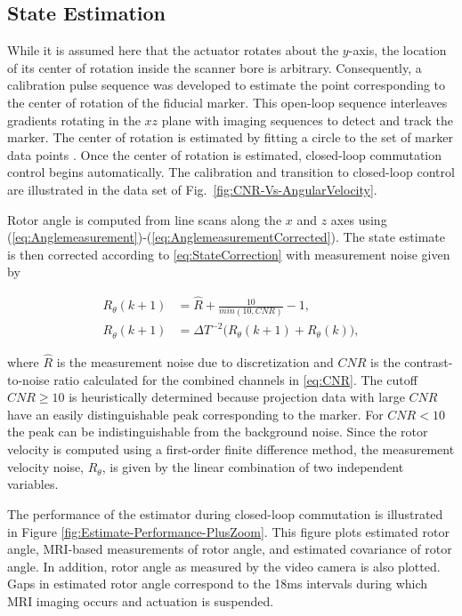 \documentclass[journal]{IEEEtran}
\begin{document}
\subsection{State Estimation}\label{subsec:ExpNoiseProperties}
While it is assumed here that the actuator rotates about the $y$-axis, the location of its center of rotation inside the scanner bore is arbitrary. Consequently, a calibration pulse sequence was developed to estimate the point corresponding to the center of rotation of the fiducial marker. This open-loop sequence interleaves gradients rotating in the $xz$ plane with imaging sequences to detect and track the marker. 
The center of rotation is estimated by fitting a circle to the set of marker data points \cite{Pratt:1987:DLF:37402.37420}. Once the center of rotation is estimated, closed-loop commutation control begins automatically. The calibration and transition to closed-loop control are illustrated in the data set of Fig.~\ref{fig:CNR-Vs-AngularVelocity}.  

Rotor angle is computed from line scans along the $x$ and $z$ axes using (\ref{eq:Anglemeasurement})-(\ref{eq:AnglemeasurementCorrected}). The state estimate is then corrected according to \eqref{eq:StateCorrection}   with measurement noise given by 

\begin{align}
	R_{\theta}(k+1) &= \hat{R} + \frac{10}{min(10,CNR)}-1, \nonumber \\
	R_{\dot{\theta}}(k+1) &= \Delta T^{-2}\bigg( R_{\theta}(k+1) + R_{\theta}(k)\bigg),
\label{eq:MeasurementNoise}
\end{align}

where $\hat{R}$ is the measurement noise due to discretization and  $CNR$ is the contrast-to-noise ratio calculated for the combined channels in \eqref{eq:CNR}. The cutoff $CNR \geq 10$ is heuristically determined because projection data with large $CNR$ have an easily distinguishable peak corresponding to the marker. For $CNR<10$ the peak can be indistinguishable from the background noise. Since the rotor velocity is computed using a first-order finite difference method, the measurement velocity noise, $R_{\dot{\theta}}$, is given by the linear combination of two independent variables.

The performance of the estimator during closed-loop commutation is illustrated in Figure \ref{fig:Estimate-Performance-PlusZoom}. This figure plots estimated rotor angle, MRI-based measurements of rotor angle, and estimated covariance of rotor angle. In addition, rotor angle as measured by the video camera is also plotted. Gaps in estimated rotor angle correspond to the 18ms intervals during which MRI imaging occurs and actuation is suspended. 
\end{document}
